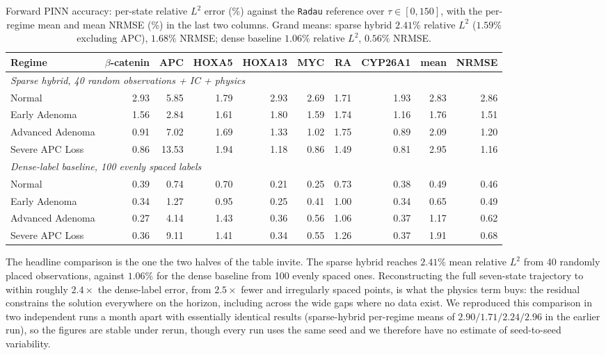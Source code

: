 \documentclass[11pt]{article}
\newcommand{\bcat}{$\beta$-\hspace{0pt}catenin}
\begin{document}
\begin{table}[H]
\centering
\small
\setlength{\tabcolsep}{4pt}
\begin{tabular}{lrrrrrrrrr}
\toprule
\textbf{Regime} & \bcat{} & APC & HOXA5 & HOXA13 & MYC & RA & CYP26A1 &
\textbf{mean} & \textbf{NRMSE} \\
\midrule
\multicolumn{10}{l}{\emph{Sparse hybrid, 40 random observations + IC + physics}}\\
Normal            & 2.93 & 5.85  & 1.79 & 2.93 & 2.69 & 1.71 & 1.93 & 2.83 & 2.86 \\
Early Adenoma     & 1.56 & 2.84  & 1.61 & 1.80 & 1.59 & 1.74 & 1.16 & 1.76 & 1.51 \\
Advanced Adenoma  & 0.91 & 7.02  & 1.69 & 1.33 & 1.02 & 1.75 & 0.89 & 2.09 & 1.20 \\
Severe APC Loss   & 0.86 & 13.53 & 1.94 & 1.18 & 0.86 & 1.49 & 0.81 & 2.95 & 1.16 \\
\midrule
\multicolumn{10}{l}{\emph{Dense-label baseline, 100 evenly spaced labels}}\\
Normal            & 0.39 & 0.74 & 0.70 & 0.21 & 0.25 & 0.73 & 0.38 & 0.49 & 0.46 \\
Early Adenoma     & 0.34 & 1.27 & 0.95 & 0.25 & 0.41 & 1.00 & 0.34 & 0.65 & 0.49 \\
Advanced Adenoma  & 0.27 & 4.14 & 1.43 & 0.36 & 0.56 & 1.06 & 0.37 & 1.17 & 0.62 \\
Severe APC Loss   & 0.36 & 9.11 & 1.41 & 0.34 & 0.55 & 1.26 & 0.37 & 1.91 & 0.68 \\
\bottomrule
\end{tabular}
\caption{Forward PINN accuracy: per-state relative $L^2$ error (\%) against the
\texttt{Radau} reference over $\tau \in [0,150]$, with the per-regime mean and
mean NRMSE (\%) in the last two columns. Grand means: sparse hybrid $2.41\%$
relative $L^2$ ($1.59\%$ excluding APC), $1.68\%$ NRMSE; dense baseline
$1.06\%$ relative $L^2$, $0.56\%$ NRMSE.}
\label{tab:fwderr}
\end{table}

The headline comparison is the one the two halves of the table invite. The
sparse hybrid reaches $2.41\%$ mean relative $L^2$ from 40 randomly placed
observations, against $1.06\%$ for the dense baseline from 100 evenly spaced
ones. Reconstructing the full seven-state trajectory to within roughly $2.4\times$
the dense-label error, from $2.5\times$ fewer and irregularly spaced points, is
what the physics term buys: the residual constrains the solution everywhere on
the horizon, including across the wide gaps where no data exist. We reproduced
this comparison in two independent runs a month apart with essentially
identical results (sparse-hybrid per-regime means of $2.90/1.71/2.24/2.96$ in
the earlier run), so the figures are stable under rerun, though every run uses
the same seed and we therefore have no estimate of seed-to-seed variability.
\end{document}
